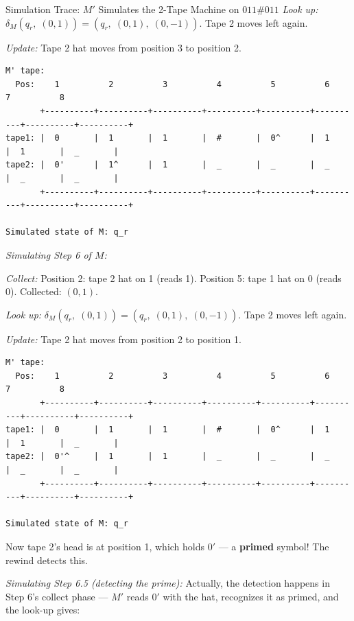 \begin{examplebox}{{Simulation Trace: $M'$ Simulates the 2-Tape Machine on $011\#011$}}
\textit{Look up:} $\delta_M(q_r,\;(0, 1)) = (q_r,\;(0, 1),\;(0, -1))$. Tape 2 moves left again.

\textit{Update:} Tape 2 hat moves from position 3 to position 2.

\begin{lstlisting}
M' tape:
  Pos:    1          2          3          4          5          6          7          8
       +----------+----------+----------+----------+----------+----------+----------+----------+
tape1: |  0       |  1       |  1       |  #       |  0^      |  1       |  1       |  _       |
tape2: |  0'      |  1^      |  1       |  _       |  _       |  _       |  _       |  _       |
       +----------+----------+----------+----------+----------+----------+----------+----------+

Simulated state of M: q_r
\end{lstlisting}

\textit{Simulating Step 6 of $M$:}

\textit{Collect:} Position 2: tape 2 hat on 1 (reads 1). Position 5: tape 1 hat on 0 (reads 0). Collected: $(0, 1)$.

\textit{Look up:} $\delta_M(q_r,\;(0, 1)) = (q_r,\;(0, 1),\;(0, -1))$. Tape 2 moves left again.

\textit{Update:} Tape 2 hat moves from position 2 to position 1.

\begin{lstlisting}
M' tape:
  Pos:    1          2          3          4          5          6          7          8
       +----------+----------+----------+----------+----------+----------+----------+----------+
tape1: |  0       |  1       |  1       |  #       |  0^      |  1       |  1       |  _       |
tape2: |  0'^     |  1       |  1       |  _       |  _       |  _       |  _       |  _       |
       +----------+----------+----------+----------+----------+----------+----------+----------+

Simulated state of M: q_r
\end{lstlisting}

Now tape 2's head is at position 1, which holds $0'$ --- a \textbf{primed} symbol! The rewind detects this.

\textit{Simulating Step 6.5 (detecting the prime):} Actually, the detection happens in Step 6's collect phase --- $M'$ reads $0'$ with the hat, recognizes it as primed, and the look-up gives:



\end{examplebox}
